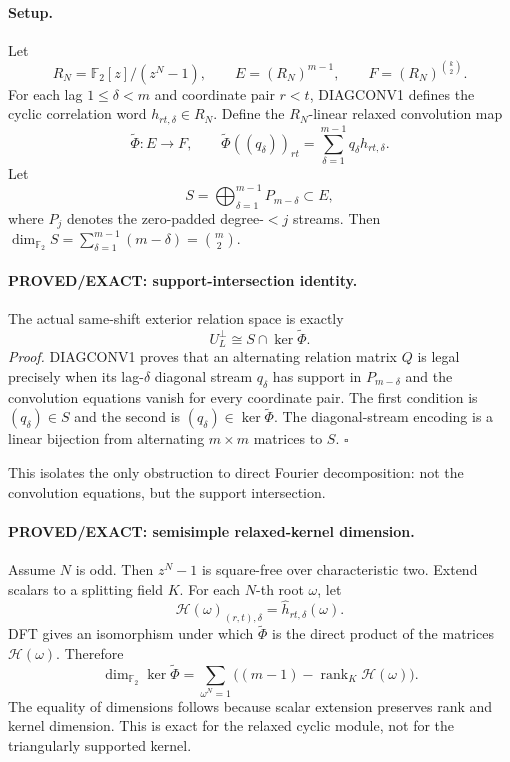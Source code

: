 \documentclass[11pt]{article}
\begin{document}
\paragraph{Setup.}
Let
\[
R_N=\mathbb F_2[z]/(z^N-1),\qquad
E=(R_N)^{m-1},\qquad
F=(R_N)^{\binom{k}{2}}.
\]
For each lag $1\le\delta<m$ and coordinate pair $r<t$, DIAGCONV1 defines the cyclic correlation word $h_{rt,\delta}\in R_N$. Define the $R_N$-linear relaxed convolution map
\[
\widetilde\Phi:E\to F,\qquad
\widetilde\Phi((q_\delta))_{rt}
=\sum_{\delta=1}^{m-1}q_\delta h_{rt,\delta}.
\]
Let
\[
S=\bigoplus_{\delta=1}^{m-1}P_{m-\delta}\subset E,
\]
where $P_j$ denotes the zero-padded degree-$<j$ streams. Then $\dim_{\mathbb F_2}S=\sum_{\delta=1}^{m-1}(m-\delta)=\binom m2$.

\paragraph{PROVED/EXACT: support-intersection identity.}
The actual same-shift exterior relation space is exactly
\[
\boxed{U_L^\perp\cong S\cap\ker\widetilde\Phi.}
\]
\emph{Proof.} DIAGCONV1 proves that an alternating relation matrix $Q$ is legal precisely when its lag-$\delta$ diagonal stream $q_\delta$ has support in $P_{m-\delta}$ and the convolution equations vanish for every coordinate pair. The first condition is $(q_\delta)\in S$ and the second is $(q_\delta)\in\ker\widetilde\Phi$. The diagonal-stream encoding is a linear bijection from alternating $m\times m$ matrices to $S$. \(\square\)

This isolates the only obstruction to direct Fourier decomposition: not the convolution equations, but the support intersection.

\paragraph{PROVED/EXACT: semisimple relaxed-kernel dimension.}
Assume $N$ is odd. Then $z^N-1$ is square-free over characteristic two. Extend scalars to a splitting field $K$. For each $N$-th root $\omega$, let
\[
\mathcal H(\omega)_{(r,t),\delta}=\widehat h_{rt,\delta}(\omega).
\]
DFT gives an isomorphism under which $\widetilde\Phi$ is the direct product of the matrices $\mathcal H(\omega)$. Therefore
\[
\boxed{
\dim_{\mathbb F_2}\ker\widetilde\Phi
=
\sum_{\omega^N=1}\bigl((m-1)-\operatorname{rank}_K\mathcal H(\omega)\bigr).
}
\]
The equality of dimensions follows because scalar extension preserves rank and kernel dimension. This is exact for the relaxed cyclic module, not for the triangularly supported kernel.
\end{document}
